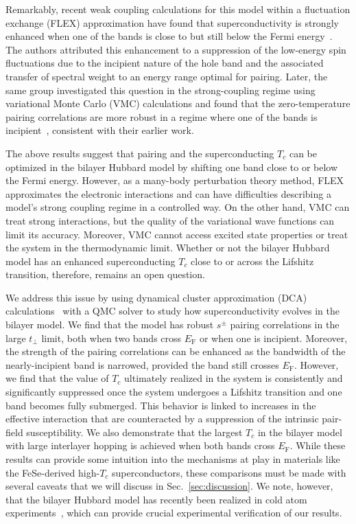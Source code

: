 \documentclass[prb,twocolumn,amsmath,amssymb,superscriptaddress,floatfix,nofootinbib]{revtex4-2}
\begin{document}
Remarkably, recent weak coupling calculations for this model within a fluctuation exchange (FLEX) approximation have found that superconductivity is strongly enhanced when one of the bands is close to but still below the Fermi energy~\cite{KurokiFlex2020}. The authors attributed this enhancement to a suppression of the low-energy spin fluctuations due to the incipient nature of the hole band and the associated transfer of spectral weight to an energy range optimal for pairing. Later, the same group investigated this question in the strong-coupling regime using variational Monte Carlo (VMC) calculations and found that the zero-temperature pairing correlations are more robust in a regime where one of the bands is incipient~\cite{KurokiVMC2020}, consistent with their earlier work. 

The above results suggest that pairing and the superconducting $T_c$ can be optimized in the bilayer Hubbard model by shifting one band close to or below the Fermi energy. However, as a many-body perturbation theory method, FLEX approximates the electronic interactions and can have difficulties describing a model's strong coupling regime in a controlled way. On the other hand, VMC can treat strong interactions, but the quality of the variational wave functions can limit its accuracy. Moreover, VMC cannot access excited state properties or treat the system in the thermodynamic limit. Whether or not the bilayer Hubbard model has an enhanced superconducting $T_c$ close to or across the Lifshitz transition, therefore, remains an open question. 

We address this issue by using dynamical cluster approximation (DCA) calculations~\cite{Jarrell2001, Maier_Review} with a QMC solver to study how superconductivity evolves in the bilayer model. We find that the model has robust $s^\pm$ pairing correlations in the large $t_\perp$ limit, both when two bands cross $E_\mathrm{F}$ or when one is incipient. Moreover, the strength of the pairing correlations can be enhanced as the bandwidth of the nearly-incipient band is narrowed, provided the band still crosses $E_\mathrm{F}$. However, we find that the value of $T_c$ ultimately realized in the system is consistently and significantly suppressed once the system undergoes a Lifshitz transition and one band becomes fully submerged. This behavior is linked to increases in the effective interaction that are counteracted by a suppression of the intrinsic pair-field susceptibility. We also demonstrate that the largest $T_c$ in the bilayer model with large interlayer hopping is achieved when both bands cross $E_\mathrm{F}$. While these results can provide some intuition into the mechanisms at play in materials like the FeSe-derived high-$T_c$ superconductors, these comparisons must be made with several caveats that we will discuss in Sec.~\ref{sec:discussion}. We note, however, that the bilayer Hubbard model has recently been realized in cold atom experiments~\cite{GallNature2021}, which can provide crucial experimental verification of our results. 
\end{document}
